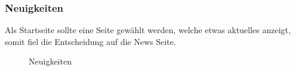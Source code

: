 \newpage
\FloatBarrier
\subsubsection{Neuigkeiten}\label{mockup_news}
Als Startseite sollte eine Seite gewählt werden, welche etwas aktuelles anzeigt, somit fiel die Entscheidung auf die News Seite.
\begin{figure}[ht]
\centering
{}
\label{fig:mockup_news}
\caption{Neuigkeiten}
\end{figure}

